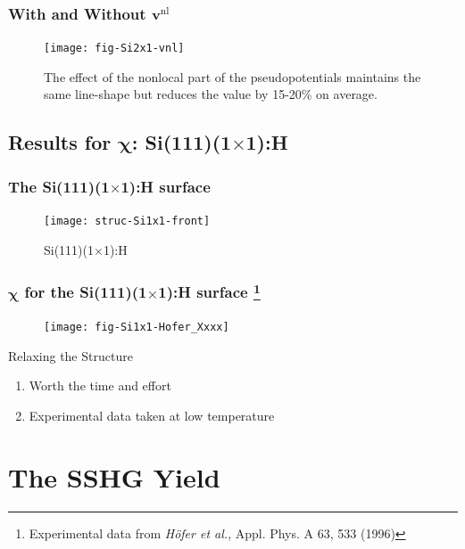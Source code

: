 \documentclass{beamer}
\begin{document}
\begin{frame}
\frametitle{With and Without \texorpdfstring{$\mathbf{v}^{\mathrm{nl}}$}{vnl}}
\begin{figure}
\centering
\texttt{[image: fig-Si2x1-vnl]}
\caption{The effect of the nonlocal part of the pseudopotentials maintains the
same line-shape but reduces the value by 15-20\% on average.}
\end{figure}
\end{frame}



\subsection{Results for \texorpdfstring{$\boldsymbol{\chi}$}{X}:
\texorpdfstring{Si(111)(1$\times$1):H}{Si(111)(1x1):H}}

\begin{frame}
\frametitle{The Si(111)(1$\times$1):H surface}
\begin{figure}
\centering
\texttt{[image: struc-Si1x1-front]}
\caption{Si(111)(1$\times$1):H}
\end{figure}
\end{frame}

\begin{frame}
\frametitle{$\boldsymbol{\chi}$ for the Si(111)(1$\times$1):H surface%
\footnote{Experimental data from \emph{H\"ofer et al.}, 
Appl. Phys. A 63, 533 (1996)}}
\vspace{-0.5cm}
\begin{figure}
\centering
\texttt{[image: fig-Si1x1-Hofer\_Xxxx]}
\end{figure}
\vspace{-0.5cm}
\begin{block}{Relaxing the Structure}
\begin{enumerate}
\item Worth the time and effort
\item Experimental data taken at low temperature
\end{enumerate}
\end{block}
\end{frame}



\section{The SSHG Yield}
\end{document}
